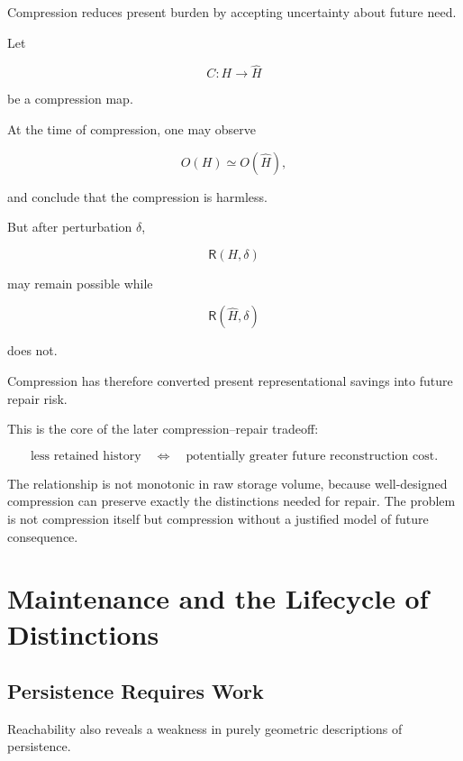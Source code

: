 \documentclass[11pt]{article}
\theoremstyle{remark}
\newcommand{\repair}{\mathsf{R}}
\begin{document}
Compression reduces present burden by accepting uncertainty about future need.

Let

\begin{equation}
C:H\rightarrow \hat{H}
\end{equation}

be a compression map.

At the time of compression, one may observe

\begin{equation}
O(H)
\simeq
O(\hat{H}),
\end{equation}

and conclude that the compression is harmless.

But after perturbation $\delta$,

\begin{equation}
\repair(H,\delta)
\end{equation}

may remain possible while

\begin{equation}
\repair(\hat{H},\delta)
\end{equation}

does not.

Compression has therefore converted present representational savings into future repair risk.

This is the core of the later compression--repair tradeoff:

\begin{equation}
\text{less retained history}
\quad\Longleftrightarrow\quad
\text{potentially greater future reconstruction cost}.
\end{equation}

The relationship is not monotonic in raw storage volume, because well-designed compression can preserve exactly the distinctions needed for repair. The problem is not compression itself but compression without a justified model of future consequence.

\section{Maintenance and the Lifecycle of Distinctions}

\subsection{Persistence Requires Work}

Reachability also reveals a weakness in purely geometric descriptions of persistence.
\end{document}

